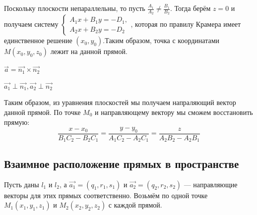 \documentclass[a4paper]{article}
\begin{document}
\begin{hproof}
        Поскольку плоскости непараллельны, то пусть $\displaystyle \frac{A_1}{A_2} \neq \frac{B_1}{B_2}$. Тогда берём $z=0$ и получаем систему $\begin{cases}
                                                                                                                                                    A_1x+B_1y=-D_1,
                                                                                                                                                    \\
                                                                                                                                                    A_2x+B_2y=-D_2
        \end{cases}$, которая по правилу Крамера имеет единственное решение $(x_0, y_0)$.\newline Таким образом, точка с координатами $M(x_0, y_0, z_0)$ лежит на данной прямой.

        $\vec{a} = \vec{n_1} \times \vec{n_2}$

        $\vec{a_1} \perp \vec{n_1}, \vec{a_2} \perp \vec{n_2}$

        Таким образом, из уравнения плоскостей мы получаем напраляющий вектор данной прямой. По точке $M_0$ и направляющему вектору мы сможем восстановить прямую:
        \begin{equation}
            \displaystyle \frac{x-x_0}{B_1C_2-B_2C_1} = \frac{y-y_0}{A_1C_2-A_2C_1} = \frac{z}{A_2B_2-A_2B_1}
        \end{equation}
    \end{hproof}

    \newpage \begin{center}
                 \begin{Large}
                 \end{Large}
    \end{center}
    \subsection*{Взаимное расположение прямых в пространстве}
    Пусть даны $l_1$ и $l_2$, а $\vec{a_1} = (q_1, r_1, s_1)$ и $\vec{a_2} = (q_2, r_2, s_2)$ --- направляющие векторы для этих прямых соответственно. Возьмём по одной точке $M_1(x_1, y_1, z_1)$ и $M_2(x_2, y_2, z_2)$ с каждой прямой.
\end{document}
